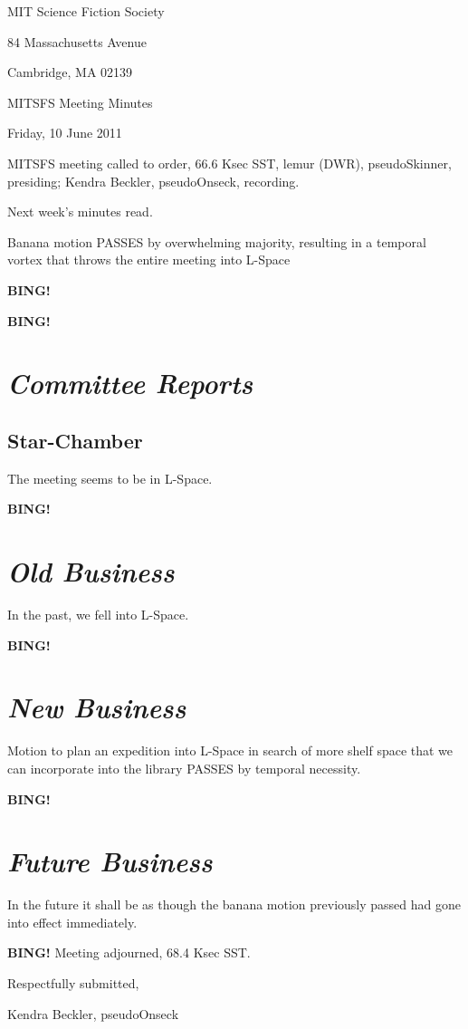 \documentclass[10pt]{article}
\newcommand{\bing}{{\bf BING!} }
\newcommand{\goto}[1]{\bing \vskip 12pt \section*{{\em{#1}}}}
\newcommand{\skinner}{lemur (DWR), pseudoSkinner}
\newcommand{\onseck}{Kendra Beckler, pseudoOnseck}
\newcommand{\meetingdate}{Friday, 10 June 2011}
\begin{document}
\begin{center}

MIT Science Fiction Society

84 Massachusetts Avenue

Cambridge, MA 02139

\vspace{12pt}

MITSFS Meeting Minutes

\meetingdate

\end{center}

\vspace{18pt}

\setlength{\parskip}{6pt}

\noindent
MITSFS meeting called to order, 66.6 Ksec SST,
\skinner, presiding; \onseck, recording.

Next week's minutes read.

Banana motion PASSES by overwhelming majority, resulting in a temporal vortex
that throws the entire meeting into L-Space

\bing

\goto{Committee Reports}

\subsection*{Star-Chamber}

The meeting seems to be in L-Space.  

\goto{Old Business}

In the past, we fell into L-Space.

\goto{New Business}

Motion to plan an expedition into L-Space in search of more shelf space
that we can incorporate into the library PASSES by temporal necessity.

\goto{Future Business}

In the future it shall be as though the banana motion previously passed had
gone into effect immediately.

\bing
\noindent
Meeting adjourned, 68.4 Ksec SST.

\vspace{18pt}

\centerline{Respectfully submitted,}
\centerline{\onseck}
\end{document}
